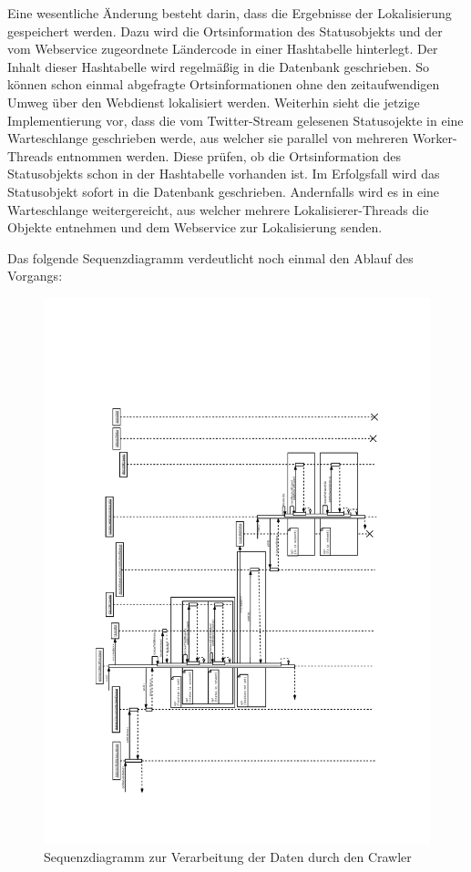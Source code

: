 Eine wesentliche Änderung besteht darin, dass die Ergebnisse der Lokalisierung gespeichert werden. Dazu wird die Ortsinformation des Statusobjekts und der vom Webservice zugeordnete Ländercode in einer Hashtabelle hinterlegt. Der Inhalt dieser Hashtabelle wird regelmäßig in die Datenbank geschrieben. So können schon einmal abgefragte Ortsinformationen ohne den zeitaufwendigen Umweg über den Webdienst lokalisiert werden. 
Weiterhin sieht die jetzige Implementierung vor, dass die vom Twitter-Stream gelesenen Statusojekte in eine Warteschlange geschrieben werde, aus welcher sie parallel von mehreren Worker-Threads entnommen werden. Diese prüfen, ob die Ortsinformation des Statusobjekts schon in der Hashtabelle vorhanden ist. Im Erfolgsfall wird das Statusobjekt sofort in die Datenbank geschrieben. Andernfalls wird es in eine  Warteschlange weitergereicht, aus welcher mehrere Lokalisierer-Threads die Objekte entnehmen und dem Webservice zur Lokalisierung senden.

Das folgende Sequenzdiagramm verdeutlicht noch einmal den Ablauf des Vorgangs:
\begin{figure}[H]
	\centering
	\includegraphics[width=\textwidth,height=\textheight,keepaspectratio=true]{dia/crawler_process_sequence}
	\caption{Sequenzdiagramm zur Verarbeitung der Daten durch den Crawler}
	\label{fig:Crawler}
\end{figure}

